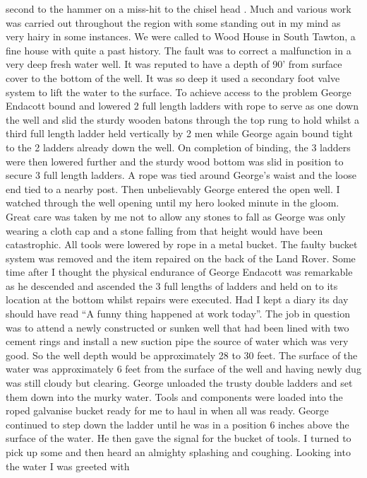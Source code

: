 second to the hammer on a miss-hit to the chisel head .  Much and various work
was carried out throughout the region with some standing out in my mind as very
hairy in some instances.  We were called to Wood House in South Tawton, a fine
house with quite a past history.  The fault was to correct a malfunction in a
very deep fresh water well. It was reputed to have a depth of 90' from surface
cover to the bottom of the well.  It was so deep it used a secondary foot valve
system to lift the water to the surface.  To achieve access to the problem
George Endacott bound and lowered 2 full length ladders with rope to serve as
one down the well and slid the sturdy wooden batons through the top rung to
hold whilst a third full length ladder held vertically by 2 men while George
again bound tight to the 2 ladders already down the well. On completion of
binding, the 3 ladders were then lowered further and the sturdy wood bottom was
slid in position to secure 3 full length ladders.  A rope was tied around
George's waist and the loose end tied to a nearby post.  Then unbelievably
George entered the open well.  I watched through the well opening until my hero
looked minute in the gloom.  Great care was taken by me not to allow any stones
to fall as George was only wearing a cloth cap and a stone falling from that
height would have been catastrophic.  All tools were lowered by rope in a metal
bucket.  The faulty bucket system was removed and the item repaired on the back
of the Land Rover.  Some time after I thought the physical endurance of George
Endacott was remarkable as he descended and ascended the 3 full lengths of
ladders and held on to its location at the bottom whilst repairs were executed.
Had I kept a diary its day should have read ``A funny thing happened at work
today''.  The job in question was to attend a newly constructed or sunken well
that had been lined with two cement rings and install a new suction pipe the
source of water which was very good.  So the well depth would be approximately
28 to 30 feet.  The surface of the water was approximately 6 feet from the
surface of the well and having newly dug was still cloudy but clearing.  George
unloaded the trusty  double ladders and set them down into the murky water.
Tools and components were loaded into the roped galvanise bucket ready for me
to haul in when all was ready.  George continued to step down the ladder until
he was in a position 6 inches above the surface of the water.  He then gave the
signal for the bucket of tools.  I turned to pick up some and then heard an
almighty splashing and coughing.  Looking into the water I was greeted with
